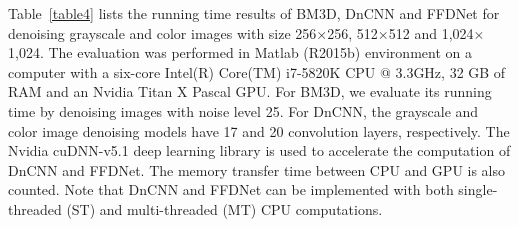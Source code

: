 \documentclass[journal]{IEEEtran}
\begin{document}
Table~\ref{table4} lists the running time results of BM3D, DnCNN and FFDNet for denoising grayscale and color images with size 256$\times$256, 512$\times$512 and 1,024$\times$1,024.
The evaluation was performed in Matlab (R2015b) environment on a computer with a six-core Intel(R) Core(TM) i7-5820K CPU @ 3.3GHz, 32 GB of RAM and an Nvidia Titan X Pascal GPU.
For BM3D, we evaluate its running time by denoising images with noise level 25. For DnCNN, the grayscale and color image denoising models have 17 and 20 convolution layers, respectively.
The Nvidia cuDNN-v5.1 deep learning library is used to accelerate the computation of DnCNN and FFDNet. The memory transfer time between CPU and GPU is also counted. Note that DnCNN and FFDNet can be implemented
with both single-threaded (ST) and multi-threaded (MT) CPU computations.
\end{document}
